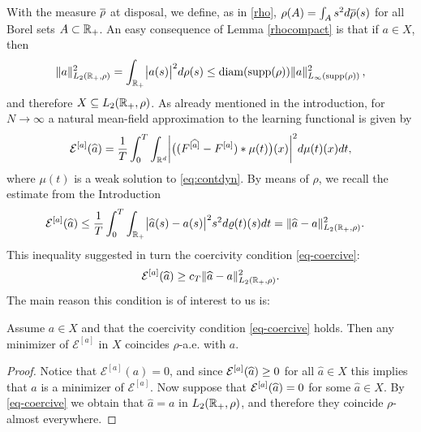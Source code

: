 With the measure $\overline\rho$ at disposal, we define, as in \eqref{rho},  $\rho(A) = \int_{A} s^2 d\overline\rho(s)$ for all Borel sets $A \subset \mathbb{R}_+$.  An easy consequence of Lemma \ref{rhocompact} is that if $a\in X$, then
\begin{align}\label{eq:inftyimplyl2}
\|a\|^2_{L_2(\mathbb{R}_+,\rho)} = \int_{\mathbb{R}_+} \bigl|a(s)\bigr|^2 d\rho(s) \leq \operatorname{diam}(\operatorname{supp}(\rho))\|a\|^2_{L_{\infty}(\operatorname{supp}(\rho))}\,,
\end{align}
and therefore $X\subseteq L_2(\mathbb{R}_+,\rho)$.  
As already mentioned in the introduction, for $N \to \infty$ a natural mean-field approximation to the learning functional is given by
\begin{align*}
	\mathcal E^{[a]}(\widehat a)=\frac{1}{T}\int_0^T \int_{\mathbb{R}^d} \biggl|\bigl((F^{[\widehat a]}-F^{[a]})\ast\mu(t)\bigr)(x)\biggr|^2d\mu(t)(x)dt,
\end{align*}
where $\mu(t)$ is a weak solution to \eqref{eq:contdyn}. 
By means of $\rho$, we recall the estimate from the Introduction
\begin{align}
\begin{split}\label{eq-rho-3}
	\mathcal E^{[a]}(\widehat a)&\leq\frac{1}{T}\int_0^T\int_{\mathbb{R}_+}\bigl|\widehat a(s)-a(s)\bigr|^2 s^2 d\varrho(t)(s) dt = \|\widehat a-a\|^2_{L_2(\mathbb{R}_+,\rho)}.
\end{split}
\end{align}
This inequality suggested in turn the coercivity condition \eqref{eq-coercive}: 
\begin{align*}
	\mathcal E^{[a]}(\widehat a)\geq c_T\|\widehat a-a\|^2_{L_2(\mathbb{R}_+,\rho)}.
\end{align*}
The main reason this condition is of interest to us is:

\begin{proposition}\label{uniquemin}
Assume $a \in X$ and that the coercivity condition \eqref{eq-coercive} holds. Then any minimizer of $\mathcal E^{[a]}$ in $X$ coincides $\rho$-a.e. with $a$.
\end{proposition}
\begin{proof}
Notice that $\mathcal E^{[a]}(a)=0$, and since $\mathcal E^{[a]}(\widehat a)\geq 0$ for all $\widehat a\in X$ this implies that $a$ is a minimizer of $\mathcal E^{[a]}$. Now suppose that $ \mathcal E^{[a]}(\widehat a)=0$ for some $\widehat a\in X$. By \eqref{eq-coercive} we obtain that $\widehat a=a$ in $L_2(\mathbb{R}_+,\rho)$, and therefore they coincide $\rho$-almost everywhere. %
\end{proof}



